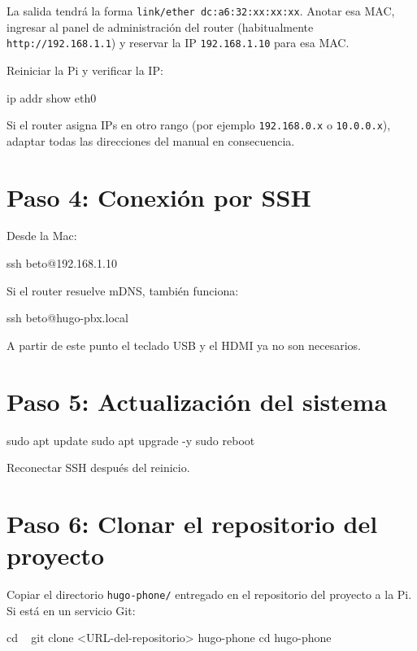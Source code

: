 La salida tendrá la forma \texttt{link/ether dc:a6:32:xx:xx:xx}. Anotar esa MAC, ingresar al panel de administración del router (habitualmente \texttt{http://192.168.1.1}) y reservar la IP \texttt{192.168.1.10} para esa MAC.

Reiniciar la Pi y verificar la IP:

\begin{shellcode}
ip addr show eth0
\end{shellcode}

\begin{tip}
Si el router asigna IPs en otro rango (por ejemplo \texttt{192.168.0.x} o \texttt{10.0.0.x}), adaptar todas las direcciones del manual en consecuencia.
\end{tip}

\section{Paso 4: Conexión por SSH}

Desde la Mac:

\begin{shellcode}
ssh beto@192.168.1.10
\end{shellcode}

Si el router resuelve mDNS, también funciona:

\begin{shellcode}
ssh beto@hugo-pbx.local
\end{shellcode}

A partir de este punto el teclado USB y el HDMI ya no son necesarios.

\section{Paso 5: Actualización del sistema}

\begin{shellcode}
sudo apt update
sudo apt upgrade -y
sudo reboot
\end{shellcode}

Reconectar SSH después del reinicio.

\section{Paso 6: Clonar el repositorio del proyecto}

Copiar el directorio \texttt{hugo-phone/} entregado en el repositorio del proyecto a la Pi. Si está en un servicio Git:

\begin{shellcode}
cd ~
git clone <URL-del-repositorio> hugo-phone
cd hugo-phone
\end{shellcode}


